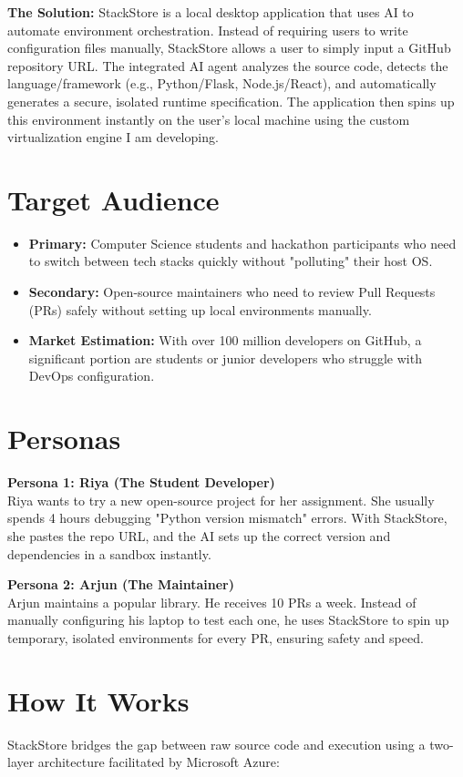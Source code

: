 \documentclass[a4paper,12pt]{article}
\begin{document}
\textbf{The Solution:} StackStore is a local desktop application that uses AI to automate environment orchestration. Instead of requiring users to write configuration files manually, StackStore allows a user to simply input a GitHub repository URL. The integrated AI agent analyzes the source code, detects the language/framework (e.g., Python/Flask, Node.js/React), and automatically generates a secure, isolated runtime specification. The application then spins up this environment instantly on the user's local machine using the custom virtualization engine I am developing.

\section{Target Audience}
\begin{itemize}
    \item \textbf{Primary:} Computer Science students and hackathon participants who need to switch between tech stacks quickly without "polluting" their host OS.
    \item \textbf{Secondary:} Open-source maintainers who need to review Pull Requests (PRs) safely without setting up local environments manually.
    \item \textbf{Market Estimation:} With over 100 million developers on GitHub, a significant portion are students or junior developers who struggle with DevOps configuration.
\end{itemize}

\section{Personas}
\textbf{Persona 1: Riya (The Student Developer)} \\
Riya wants to try a new open-source project for her assignment. She usually spends 4 hours debugging "Python version mismatch" errors. With StackStore, she pastes the repo URL, and the AI sets up the correct version and dependencies in a sandbox instantly.

\textbf{Persona 2: Arjun (The Maintainer)} \\
Arjun maintains a popular library. He receives 10 PRs a week. Instead of manually configuring his laptop to test each one, he uses StackStore to spin up temporary, isolated environments for every PR, ensuring safety and speed.

\section{How It Works}
StackStore bridges the gap between raw source code and execution using a two-layer architecture facilitated by Microsoft Azure:
\end{document}
